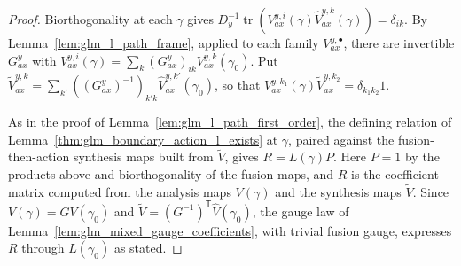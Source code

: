 \begin{proof}
    \leanok
    Biorthogonality at each $\gamma$ gives
    $D_y^{-1}\operatorname{tr}(V_{ax}^{y,i}(\gamma)\widehat V_{ax}^{y,k}(\gamma))
        =\delta_{ik}$. By Lemma~\ref{lem:glm_l_path_frame}, applied to each
    family $V_{ax}^{y,\bullet}$, there are invertible $G_{ax}^y$ with
    $V_{ax}^{y,i}(\gamma)=\sum_k(G_{ax}^y)_{ik}V_{ax}^{y,k}(\gamma_0)$. Put
    $\widetilde V_{ax}^{y,k}=\sum_{k'}((G_{ax}^y)^{-1})_{k'k}
        \widehat V_{ax}^{y,k'}(\gamma_0)$, so that
    $V_{ax}^{y,k_1}(\gamma)\widetilde V_{ax}^{y,k_2}=\delta_{k_1k_2}1$.

    As in the proof of Lemma~\ref{lem:glm_l_path_first_order}, the defining
    relation of Lemma~\ref{thm:glm_boundary_action_l_exists} at $\gamma$,
    paired against the fusion-then-action synthesis maps built from
    $\widetilde V$, gives $R=L(\gamma)P$. Here $P=1$ by the products above
    and biorthogonality of the fusion maps, and $R$ is the coefficient matrix
    computed from the analysis maps $V(\gamma)$ and the synthesis maps
    $\widetilde V$. Since $V(\gamma)=GV(\gamma_0)$ and
    $\widetilde V=(G^{-1})^{\mathsf T}\widehat V(\gamma_0)$, the gauge law
    of Lemma~\ref{lem:glm_mixed_gauge_coefficients}, with trivial fusion
    gauge, expresses $R$ through $L(\gamma_0)$ as stated.
\end{proof}

